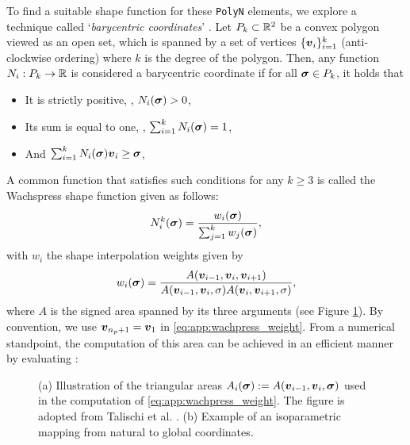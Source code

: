 To find a suitable shape function for these \texttt{PolyN} elements, we explore a technique called `\textit{barycentric coordinates}' \cite{Floater2014Jun,Floater2015May}. Let $P_k \subset \mathbb{R}^2$ be a convex polygon viewed as an open set, which is spanned by a set of vertices $\{{\boldsymbol{v}}_i\}_{i=1}^k$ (anti-clockwise ordering) where $k$ is the degree of the polygon. Then, any function $N_i: P_k \to \mathbb{R}$ is considered a barycentric coordinate if for all $\boldsymbol{\sigma} \in P_k$, it holds that 
%
\begin{itemize}
    \vspace{-2mm}
    \setlength\itemsep{0.1em}
    \item It is strictly positive, \ie, $N_i(\boldsymbol{\sigma}) > 0$, 
    \item Its sum is equal to one, \ie, $\sum_{i=1}^k N_i(\boldsymbol{\sigma}) = 1$, 
    \item And $\sum_{i=1}^k N_i(\boldsymbol{\sigma}) {\boldsymbol{v}}_i \ge \boldsymbol{\sigma}$, 
\end{itemize}
A common function that satisfies such conditions for any $k \ge 3$ is called the Wachspress shape function given as follows:
%
\begin{equation}
N^k_i(\boldsymbol{\sigma})  = \frac{w_i(\boldsymbol{\sigma})}{\sum_{j=1}^{k} w_j(\boldsymbol{\sigma})},
\label{eq:app:wachpress}
\end{equation}
%
with $w_i$ the shape interpolation weights given by 
%
\begin{equation}
w_i(\boldsymbol{\sigma})  = \frac{A({\boldsymbol{v}}_{i-1}, {\boldsymbol{v}}_{i}, {\boldsymbol{v}}_{i+1})}{A({\boldsymbol{v}}_{i-1}, {\boldsymbol{v}}_{i}, \sigma) A({\boldsymbol{v}}_{i}, {\boldsymbol{v}}_{i+1}, \sigma)},
\label{eq:app:wachpress_weight}
\end{equation}
%
where $A$ is the signed area spanned by its three arguments (see Figure \ref{app:fig:C3:voronoimeshExplain}). By convention, we use ${\boldsymbol{v}}_{n_p + 1} = {\boldsymbol{v}}_1$ in \eqref{eq:app:wachpress_weight}. From a numerical standpoint, the computation of this area can be achieved in an efficient manner by evaluating \cite{Talischi2012Mar}:
\begin{figure}
\centering
\vspace{-5mm}

\caption{(a) Illustration of the triangular areas $A_i(\boldsymbol{\sigma}) := A({\boldsymbol{v}}_{i-1}, {\boldsymbol{v}}_i, \boldsymbol{\sigma})$ used in the computation of \eqref{eq:app:wachpress_weight}. The figure is adopted from Talischi et al. \cite{Talischi2012Mar,Talischi2012}. (b) Example of an isoparametric mapping from natural to global coordinates.\label{app:fig:C3:voronoimeshExplain}}
\vspace{-3mm}
\end{figure}
